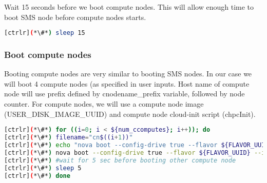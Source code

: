 	Wait 15 seconds before we boot compute nodes. This will allow enough time to boot SMS node before compute nodes starts. 


\begin{lstlisting}[language=bash,keywords={}]
[ctrlr](*\#*) sleep 15
\end{lstlisting} 


\subsubsection{Boot compute nodes}

	Booting compute nodes are very similar to booting SMS nodes. In our case we will boot 4 compute nodes (as specified in user inputs. Host name of compute node will use prefix defined by cnodename\_prefix variable, followed by node counter. For compute nodes, we will use a compute node image (USER\_DISK\_IMAGE\_UUID) and compute node cloud-init script (chpcInit). 


\begin{lstlisting}[language=bash,keywords={}]
[ctrlr](*\#*) for ((i=0; i < ${num_ccomputes}; i++)); do
[ctrlr](*\#*) filename="cn$((i+1))"
[ctrlr](*\#*) echo "nova boot --config-drive true --flavor ${FLAVOR_UUID} --image ${USER_DISK_IMAGE_UUID} --key-name ${KEYPAIR_NAME} --meta role=webservers --user-data=$chpcInit --nic port-id=${NEUTRON_PORT_ID_CC[$i]} ${cnodename_prefix}$((i+1))" > boot_$filename
[ctrlr](*\#*) nova boot --config-drive true --flavor ${FLAVOR_UUID} --image ${USER_DISK_IMAGE_UUID} --key-name ${KEYPAIR_NAME} --meta role=webservers --user-data=$chpcInit --nic port-id=${NEUTRON_PORT_ID_CC[$i]} ${cnodename_prefix}$((i+1))
[ctrlr](*\#*) #wait for 5 sec before booting other compute node
[ctrlr](*\#*) sleep 5
[ctrlr](*\#*) done
\end{lstlisting}

